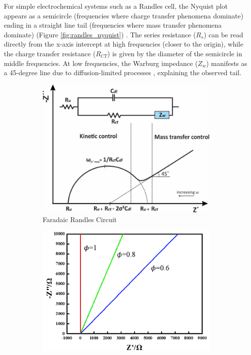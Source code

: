 For simple electrochemical systems such as a Randles cell, the Nyquist plot appears as a semicircle (frequencies where charge transfer phenomena dominate) ending in a straight line tail (frequencies where mass transfer phenomena dominate) (Figure \ref{fig:randles_nyquist}) \cite{lazanasErratumElectrochemicalImpedance2025}. The series resistance ($R_s$) can be read directly from the x-axis intercept at high frequencies (closer to the origin), while the charge transfer resistance ($R_{CT}$) is given by the diameter of the semicircle in middle frequencies. At low frequencies, the Warburg impedance ($Z_w$) manifests as a 45-degree line due to diffusion-limited processes \cite{lazanasErratumElectrochemicalImpedance2025}, explaining the observed tail.

\begin{figure}[H]
    \centering
    \begin{subfigure}{0.45\textwidth}
        \centering
        \includegraphics[width=\textwidth]{RandlesNyquist.jpeg}
        \caption[Faradaic Randles Circuit]{Faradaic Randles Circuit \cite{lazanasErratumElectrochemicalImpedance2025}}
        \label{fig:randles_nyquist_faradaic}
    \end{subfigure}
    \hfill
    \begin{subfigure}{0.45\textwidth}
        \centering
        \includegraphics[width=\textwidth]{RandlesNonFaradaicNyquist.png}

\end{subfigure}
\end{figure}
